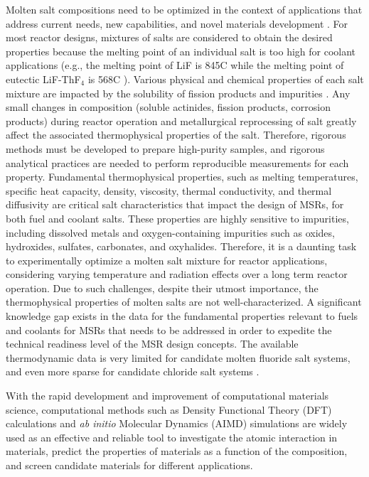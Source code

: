 \documentclass[review]{elsarticle}
\providecommand{\DIFaddtex}[1]{{\bf #1}} %
\providecommand{\DIFaddbegin}{\protect\color{blue}} %
\providecommand{\DIFaddend}{\protect\color{black}} %
\providecommand{\DIFadd}[1]{\texorpdfstring{\DIFaddtex{#1}}{#1}} %
\newcommand{\DIFaddincludegraphics}[2][]{{\color{blue}\fbox{\DIFOincludegraphics[#1]{#2}}}} %
\DeclareRobustCommand{\DIFaddbegin}{\DIFOaddbegin \let\includegraphics\DIFaddincludegraphics} %
\DeclareRobustCommand{\DIFaddend}{\DIFOaddend \let\includegraphics\DIFOincludegraphics} %
\begin{document}
Molten salt compositions need to be optimized in the context of applications that address current needs, new capabilities, and novel materials development \cite{WU2018159}. For most reactor designs, mixtures of salts are considered to obtain the desired properties because the melting point of an individual salt is too high for coolant applications (e.g., the melting point of LiF is 845\degree C while the melting point of eutectic LiF-ThF$_{4}$ is 568\degree C \cite{CAPELLI2013110}). Various physical and chemical properties of each salt mixture are impacted by the solubility of fission products and impurities \DIFaddbegin \DIFadd{\cite{Song2017}}\DIFaddend . Any small changes in composition (soluble actinides, fission products, corrosion products) during reactor operation and metallurgical reprocessing of salt greatly affect the associated thermophysical properties of the salt. Therefore, rigorous methods must be developed to prepare high-purity samples, and rigorous analytical practices are needed to perform reproducible measurements for each property. Fundamental thermophysical properties, such as melting temperatures, specific heat capacity, density, viscosity, thermal conductivity, and thermal diffusivity are critical salt characteristics that impact the design of MSRs, for both fuel and coolant salts. These properties are highly sensitive to impurities, including dissolved metals and oxygen-containing impurities such as oxides, hydroxides, sulfates, carbonates, and oxyhalides. Therefore, it is a daunting task to experimentally optimize a molten salt mixture for reactor applications, considering varying temperature and radiation effects over a long term reactor operation. Due to such challenges, despite their utmost importance, the thermophysical properties of molten salts are not well-characterized. A significant knowledge gap exists in the data for the fundamental properties relevant to fuels and coolants for MSRs that needs to be addressed in order to expedite the technical readiness level of the MSR design concepts. The available thermodynamic data is very limited for candidate molten fluoride salt systems, and even more sparse for candidate chloride salt systems \cite{Janz1988,capelli2012,fredrickson2018molten,benevs2020molten,McMurray2021}.

With the rapid development and improvement of computational materials science, computational methods such as Density Functional Theory (DFT) calculations and \textit{ab initio} Molecular Dynamics (AIMD) simulations are widely used as an effective and reliable tool to investigate the atomic interaction in materials, predict the properties of materials as a function of the composition, and screen candidate materials for different applications. 
\end{document}
